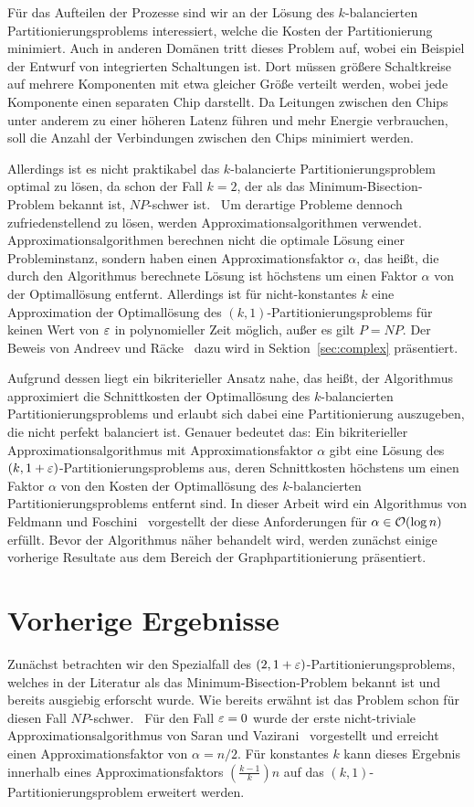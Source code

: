 Für das Aufteilen der Prozesse sind wir an der Lösung des $k$\hyp balancierten Partitionierungsproblems interessiert, welche die Kosten der Partitionierung minimiert.
Auch in anderen Domänen tritt dieses Problem auf, wobei ein Beispiel der Entwurf von integrierten Schaltungen ist.
Dort müssen größere Schaltkreise auf mehrere Komponenten mit etwa gleicher Größe verteilt werden, wobei jede Komponente einen separaten Chip darstellt.
Da Leitungen zwischen den Chips unter anderem zu einer höheren Latenz führen und mehr Energie verbrauchen, soll die Anzahl der Verbindungen zwischen den Chips minimiert werden.

Allerdings ist es nicht praktikabel das $k$\hyp balancierte Partitionierungsproblem optimal zu lösen, da schon der Fall $k=2$, der als das Minimum-Bisection-Problem bekannt ist, $NP$\hyp schwer ist.~\cite{gj79}
Um derartige Probleme dennoch zufriedenstellend zu lösen, werden Approximationsalgorithmen verwendet.
Approximationsalgorithmen berechnen nicht die optimale Lösung einer Probleminstanz, sondern haben einen Approximationsfaktor $\alpha$, das heißt, die durch den Algorithmus berechnete Lösung ist höchstens um einen Faktor $\alpha$ von der Optimallösung entfernt.
Allerdings ist für nicht-konstantes $k$ eine Approximation der Optimallösung des $(k, 1)$\hyp Partitionierungsproblems für keinen Wert von $\varepsilon$ in polynomieller Zeit möglich, außer es gilt $P=NP$.
Der Beweis von Andreev und Räcke~\cite{ar06} dazu wird in Sektion~\ref{sec:complex} präsentiert.

Aufgrund dessen liegt ein bikriterieller Ansatz nahe, das heißt, der Algorithmus approximiert die Schnittkosten der Optimallösung des $k$\hyp balancierten Partitionierungsproblems und erlaubt sich dabei eine Partitionierung auszugeben, die nicht perfekt balanciert ist.
Genauer bedeutet das: Ein bikriterieller Approximationsalgorithmus mit Approximationsfaktor $\alpha$ gibt eine Lösung des $(k, 1 + \varepsilon)$\hyp Partitionierungsproblems aus, deren Schnittkosten höchstens um einen Faktor $\alpha$ von den Kosten der Optimallösung des $k$\hyp balancierten Partitionierungsproblems entfernt sind.
In dieser Arbeit wird ein Algorithmus von Feldmann und Foschini~\cite{FF15} vorgestellt der diese Anforderungen für $\alpha \in \mathcal{O}(\log n)$ erfüllt.
Bevor der Algorithmus näher behandelt wird, werden zunächst einige vorherige Resultate aus dem Bereich der Graphpartitionierung präsentiert.

\section{Vorherige Ergebnisse}
Zunächst betrachten wir den Spezialfall des $(2, 1 + \varepsilon)$\hyp Partitionierungsproblems, welches in der Literatur als das Minimum-Bisection-Problem bekannt ist und bereits ausgiebig erforscht wurde.
Wie bereits erwähnt ist das Problem schon für diesen Fall $NP$\hyp schwer.~\cite{gj79}
Für den Fall $\varepsilon = 0$ wurde der erste nicht-triviale Approximationsalgorithmus von Saran und Vazirani~\cite{SV91} vorgestellt und erreicht einen Approximationsfaktor von $\alpha = n/2$.
Für konstantes $k$ kann dieses Ergebnis innerhalb eines Approximationsfaktors $\left(\frac{k-1}{k}\right)n$ auf das $(k, 1)$\hyp Partitionierungsproblem erweitert werden.

